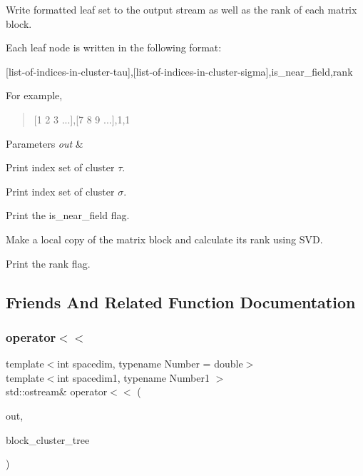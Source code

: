 Write formatted leaf set to the output stream as well as the rank of each matrix block.

Each leaf node is written in the following format\+:

\begin{quote}


\end{quote}
\mbox{[}list-\/of-\/indices-\/in-\/cluster-\/tau\mbox{]},\mbox{[}list-\/of-\/indices-\/in-\/cluster-\/sigma\mbox{]},is\+\_\+near\+\_\+field,rank

For example,

\begin{quote}
\mbox{[}1 2 3 ...\mbox{]},\mbox{[}7 8 9 ...\mbox{]},1,1 \end{quote}

\begin{DoxyParams}{Parameters}
{\em out} & \\
\hline
\end{DoxyParams}
Print index set of cluster $\tau$.

Print index set of cluster $\sigma$.

Print the {\ttfamily is\+\_\+near\+\_\+field} flag.

Make a local copy of the matrix block and calculate its rank using S\+VD.

Print the {\ttfamily rank} flag.

\subsection{Friends And Related Function Documentation}
\mbox{\label{classBlockClusterTree_a6ead7d49add78a2462eb039f00bf7f6a}} 
\subsubsection{\texorpdfstring{operator$<$$<$}{operator<<}}
{\footnotesize\ttfamily template$<$int spacedim, typename Number = double$>$ \\
template$<$int spacedim1, typename Number1 $>$ \\
std\+::ostream\& operator$<$$<$ (\begin{DoxyParamCaption}\item[{std\+::ostream \&}]{out,  }\item[{const \hyperlink{classBlockClusterTree}{Block\+Cluster\+Tree}$<$ spacedim1, Number1 $>$ \&}]{block\+\_\+cluster\+\_\+tree }\end{DoxyParamCaption})\hspace{0.3cm}{\ttfamily [friend]}}

